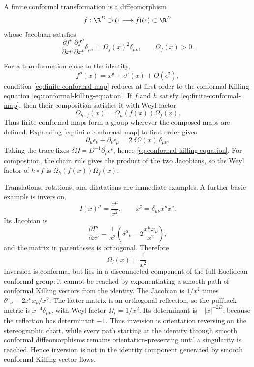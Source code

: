 \begin{definition}
\label{def:finite-euclidean-conformal-map}
A finite conformal transformation is a diffeomorphism
\[
  f:\R^D\supset U\longrightarrow f(U)\subset\R^D
\]
whose Jacobian satisfies
\begin{equation}
  \frac{\partial f^\rho}{\partial x^\mu}
  \frac{\partial f^\sigma}{\partial x^\nu}
  \delta_{\rho\sigma}
  =
  \Omega_f(x)^2\delta_{\mu\nu},
  \qquad
  \Omega_f(x)>0.
  \label{eq:finite-conformal-map}
\end{equation}
\end{definition}

For a transformation close to the identity,
\[
  f^\mu(x)=x^\mu+\epsilon^\mu(x)+O(\epsilon^2),
\]
condition \eqref{eq:finite-conformal-map} reduces at first order to the
conformal Killing equation \eqref{eq:conformal-killing-equation}.  If
\(f\) and \(h\) satisfy \eqref{eq:finite-conformal-map}, then their
composition satisfies it with Weyl factor
\[
  \Omega_{h\circ f}(x)=\Omega_h(f(x))\Omega_f(x).
\]
Thus finite conformal maps form a group wherever the composed maps are
defined.
Expanding \eqref{eq:finite-conformal-map} to first order gives
\[
  \partial_\mu\epsilon_\nu+\partial_\nu\epsilon_\mu
  =
  2\,\delta\Omega(x)\,\delta_{\mu\nu}.
\]
Taking the trace fixes
\(\delta\Omega=D^{-1}\partial_\rho\epsilon^\rho\), hence
\eqref{eq:conformal-killing-equation}.  For composition, the chain rule gives
the product of the two Jacobians, so the Weyl factor of \(h\circ f\) is
\(\Omega_h(f(x))\Omega_f(x)\).

Translations, rotations, and dilatations are immediate examples.  A further
basic example is inversion,
\begin{equation}
  I(x)^\mu=\frac{x^\mu}{x^2},
  \qquad
  x^2=\delta_{\mu\nu}x^\mu x^\nu .
  \label{eq:inversion-map}
\end{equation}
Its Jacobian is
\[
  \frac{\partial I^\mu}{\partial x^\nu}
  =
  \frac1{x^2}
  \left(
  \delta^\mu{}_\nu-2\frac{x^\mu x_\nu}{x^2}
  \right),
\]
and the matrix in parentheses is orthogonal.  Therefore
\[
  \Omega_I(x)=\frac1{x^2}.
\]
Inversion is conformal but lies in a disconnected component of the full
Euclidean conformal group: it cannot be reached by exponentiating a smooth
path of conformal Killing vectors from the identity.
The Jacobian is \(1/x^2\) times
\(\delta^\mu{}_\nu-2x^\mu x_\nu/x^2\).  The latter matrix is an orthogonal
reflection, so the pullback metric is \(x^{-4}\delta_{\mu\nu}\), with Weyl
factor \(\Omega_I=1/x^2\).  Its determinant is
\(-|x|^{-2D}\), because the reflection has determinant \(-1\).  Thus inversion
is orientation reversing on the stereographic chart, while every path starting
at the identity through smooth conformal diffeomorphisms remains
orientation-preserving until a singularity is reached.  Hence inversion is not
in the identity component generated by smooth conformal Killing vector flows.

